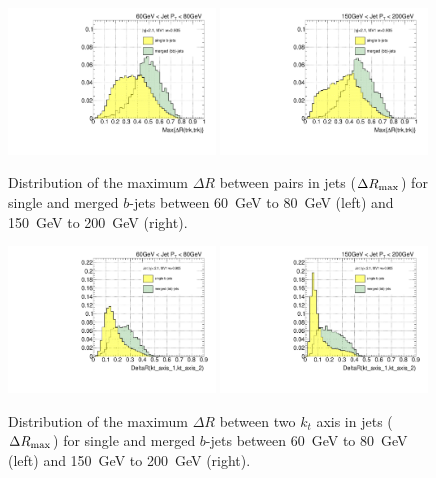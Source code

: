 \begin{figure}[tp]
\centering
\includegraphics[width=0.49\textwidth]{FIGS/VarsSingleMerged/drmax060.pdf}
\includegraphics[width=0.49\textwidth]{FIGS/VarsSingleMerged/drmax150.pdf}
\caption{Distribution of the maximum $\Delta R$ between pairs in jets ($\Delta R_{\rm max}$) for single and merged $b$-jets between 60~GeV to 80~GeV (left) and 150~GeV to 200~GeV (right).}
\label{fig:drmaxsinglemerged}
\end{figure}

\begin{figure}[tp]
\centering
\includegraphics[width=0.49\textwidth]{FIGS/VarsSingleMerged/DRkt2axes060.pdf}
\includegraphics[width=0.49\textwidth]{FIGS/VarsSingleMerged/DRkt2axes150.pdf}
\caption{Distribution of the maximum $\Delta R$ between two $k_t$ axis in jets ($\Delta R_{\rm max}$) for single and merged $b$-jets between 60~GeV to 80~GeV (left) and 150~GeV to 200~GeV (right).}
\label{fig:drktsinglemerged}
\end{figure}

